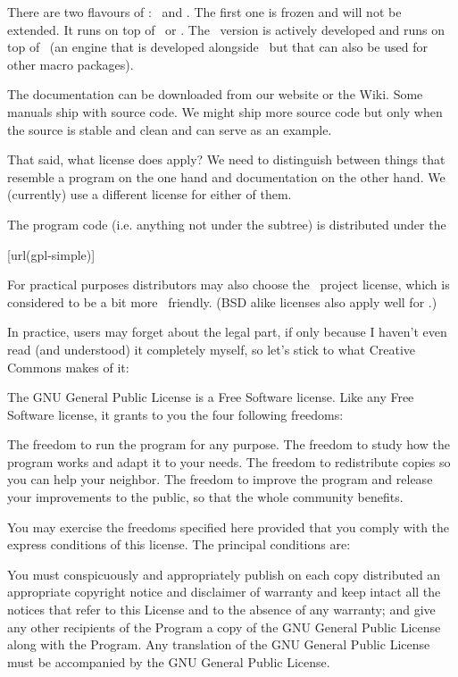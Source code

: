There are two flavours of \CONTEXT: \MKII\ and \MKIV. The first one is frozen and
will not be extended. It runs on top of \PDFTEX\ or \XETEX. The \MKIV\ version is
actively developed and runs on top of \LUATEX\ (an engine that is developed
alongside \CONTEXT\ but that can also be used for other macro packages).

The documentation can be downloaded from our website or the Wiki. Some manuals
ship with source code. We might ship more source code but only when the source is
stable and clean and can serve as an example.

That said, what license does apply? We need to distinguish between things that
resemble a program on the one hand and documentation on the other hand. We
(currently) use a different license for either of them.

\stopsubject

\startsubject[title={The Code}]

The program code (i.e. anything not under the  subtree) is
distributed under the

\startnarrower
{}[url(gpl-simple)]
\stopnarrower

For practical purposes distributors may also choose the \LATEX\ project license,
which is considered to be a bit more \TEX\ friendly. (BSD alike licenses also
apply well for \CONTEXT.)

In practice, users may forget about the legal part, if only because I haven't
even read (and understood) it completely myself, so let's stick to what Creative
Commons makes of it:

\startcolor[blue]
The GNU General Public License is a Free Software license. Like any Free Software
license, it grants to you the four following freedoms:

\startitemize
    \startitem
        The freedom to run the program for any purpose.
    \stopitem
    \startitem
        The freedom to study how the program works and adapt it to your needs.
    \stopitem
    \startitem
        The freedom to redistribute copies so you can help your neighbor.
    \stopitem
    \startitem
        The freedom to improve the program and release your improvements to the
        public, so that the whole community benefits.
    \stopitem
\stopitemize

You may exercise the freedoms specified here provided that you comply with the
express conditions of this license. The principal conditions are:

You must conspicuously and appropriately publish on each copy distributed an
appropriate copyright notice and disclaimer of warranty and keep intact all the
notices that refer to this License and to the absence of any warranty; and give
any other recipients of the Program a copy of the GNU General Public License
along with the Program. Any translation of the GNU General Public License must be
accompanied by the GNU General Public License.

